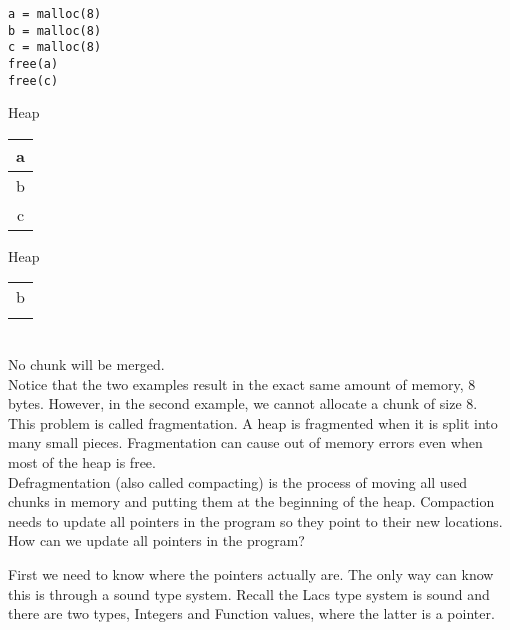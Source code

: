 \documentclass[12pt, letterpaper]{article}
\begin{document}
\begin{minipage}[t]{0.5\textwidth}
\begin{lstlisting}
a = malloc(8)
b = malloc(8)
c = malloc(8)
free(a)
free(c)
\end{lstlisting}
\end{minipage}
\begin{minipage}[t]{0.5\textwidth}
\begin{center}

\begin{minipage}[t]{0.25\textwidth}
Heap

\begin{tabular}{|c|}
\hline
a\\
\hline
b\\
\hline
c\\
\hline
\end{tabular}
\end{minipage}
\begin{minipage}[t]{0.25\textwidth}
Heap

\begin{tabular}{|c|}
\hline
\\
\hline
b\\
\hline
\\
\hline
\end{tabular}
\end{minipage}
\end{center}
\end{minipage}\\
No chunk will be merged.\\

Notice that the two examples result in the exact same amount of memory, 8 bytes. However, in the second example, we cannot allocate a chunk of size 8.\\

This problem is called fragmentation. A heap is fragmented when it is split into many small pieces. Fragmentation can cause out of memory errors even when most of the heap is free.\\

Defragmentation (also called compacting) is the process of moving all used chunks in memory and putting them at the beginning of the heap. Compaction needs to update all pointers in the program so they point to their new locations.\\

How can we update all pointers in the program?

First we need to know where the pointers actually are. The only way can know this is through a sound type system. Recall the Lacs type system is sound and there are two types, Integers and Function values, where the latter is a pointer.\\
\end{document}
